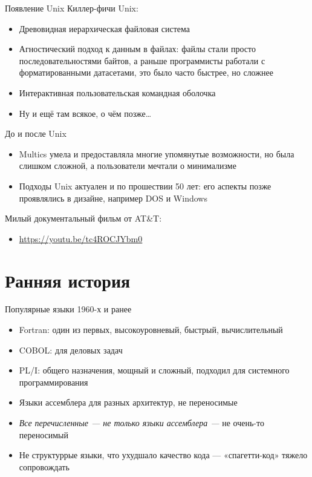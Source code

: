 \documentclass[xetex,aspectratio=169]{beamer}
\begin{document}
\begin{frame}{Появление Unix}
Киллер-фичи Unix:

\begin{itemize}
	\item Древовидная иерархическая файловая система
	\item Агностический подход к данным в файлах: файлы стали просто последовательностями байтов, а раньше программисты работали с форматированными датасетами, это было часто быстрее, но сложнее
	\item Интерактивная пользовательская командная оболочка
	\pause
	\item Ну и ещё там всякое, о чём позже\ldots
\end{itemize}

\end{frame}

\begin{frame}{До и после Unix}

\begin{itemize}
	\item Multics умела и предоставляла многие упомянутые возможности, но была слишком сложной, а пользователи мечтали о минимализме
	\item Подходы Unix актуален и по прошествии 50 лет: его аспекты позже проявлялись в дизайне, например DOS и Windows
\end{itemize}

Милый документальный фильм от AT\&T:
\begin{itemize}
	\item \url{https://youtu.be/tc4ROCJYbm0}
\end{itemize}

\end{frame}

\section{Ранняя история}

\begin{frame}{Популярные языки 1960-х и ранее}
	\begin{itemize}
		\item Fortran: один из первых, высокоуровневый, быстрый, вычислительный
		\item COBOL: для деловых задач
		\item PL/I: общего назначения, мощный и сложный, подходил для системного программирования
		\item Языки ассемблера для разных архитектур, не переносимые
	\end{itemize}

\pause

	\begin{itemize}
		\item \emph{Все перечисленные --- не только языки ассемблера ---} не очень-то переносимый
		\item Не структуррые языки, что ухудшало качество кода --- «спагетти-код» тяжело сопровождать
	\end{itemize}
\end{frame}
\end{document}
